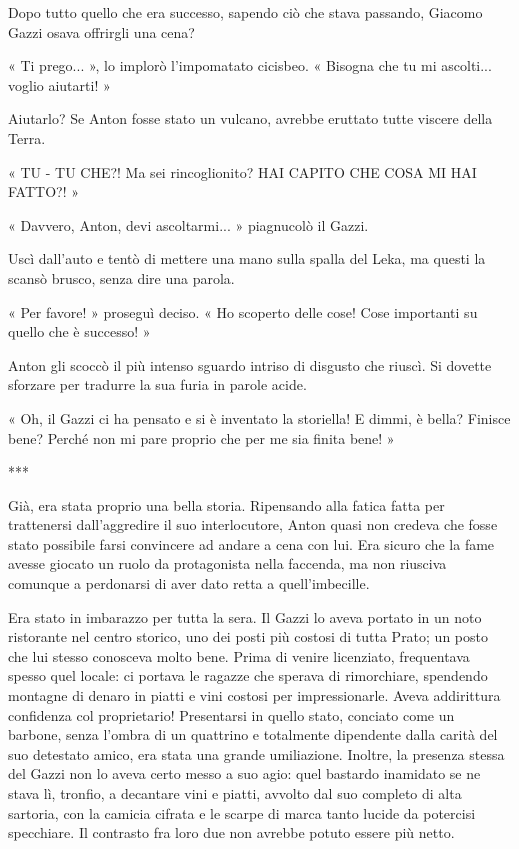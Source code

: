 Dopo tutto quello che era successo, sapendo ciò che stava passando, Giacomo Gazzi osava offrirgli una cena?

« Ti prego... », lo implorò l'impomatato cicisbeo. « Bisogna che tu mi ascolti... voglio aiutarti! »

Aiutarlo? Se Anton fosse stato un vulcano, avrebbe eruttato tutte viscere della Terra.

« TU - TU CHE?! Ma sei rincoglionito? HAI CAPITO CHE COSA MI HAI FATTO?! »

« Davvero, Anton, devi ascoltarmi... » piagnucolò il Gazzi.

Uscì dall'auto e tentò di mettere una mano sulla spalla del Leka, ma questi la scansò brusco, senza dire una parola.

« Per favore! » proseguì deciso. « Ho scoperto delle cose! Cose importanti su quello che è successo! »

Anton gli scoccò il più intenso sguardo intriso di disgusto che riuscì. Si dovette sforzare per tradurre la sua furia in parole acide.

« Oh, il Gazzi ci ha pensato e si è inventato la storiella! E dimmi, è bella? Finisce bene? Perché non mi pare proprio che per me sia finita bene! »

***

Già, era stata proprio una bella storia. Ripensando alla fatica fatta per trattenersi dall'aggredire il suo interlocutore, Anton quasi non credeva che fosse stato possibile farsi convincere ad andare a cena con lui. Era sicuro che la fame avesse giocato un ruolo da protagonista nella faccenda, ma non riusciva comunque a perdonarsi di aver dato retta a quell'imbecille.

Era stato in imbarazzo per tutta la sera. Il Gazzi lo aveva portato in un noto ristorante nel centro storico, uno dei posti più costosi di tutta Prato; un posto che lui stesso conosceva molto bene. Prima di venire licenziato, frequentava spesso quel locale: ci portava le ragazze che sperava di rimorchiare, spendendo montagne di denaro in piatti e vini costosi per impressionarle. Aveva addirittura confidenza col proprietario! Presentarsi in quello stato, conciato come un barbone, senza l'ombra di un quattrino e totalmente dipendente dalla carità del suo detestato amico, era stata una grande umiliazione. Inoltre, la presenza stessa del Gazzi non lo aveva certo messo a suo agio: quel bastardo inamidato se ne stava lì, tronfio, a decantare vini e piatti, avvolto dal suo completo di alta sartoria, con la camicia cifrata e le scarpe di marca tanto lucide da potercisi specchiare. Il contrasto fra loro due non avrebbe potuto essere più netto.


